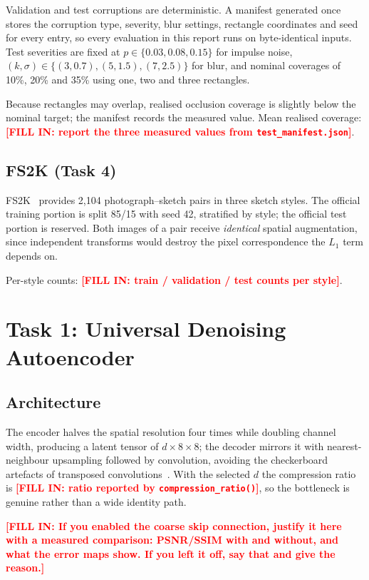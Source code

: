 \documentclass[conference]{IEEEtran}
\newcommand{\PLACEHOLDER}[1]{\textcolor{red}{\textbf{[FILL IN: #1]}}}
\begin{document}
Validation and test corruptions are deterministic. A manifest generated once
stores the corruption type, severity, blur settings, rectangle coordinates and
seed for every entry, so every evaluation in this report runs on byte-identical
inputs. Test severities are fixed at $p \in \{0.03, 0.08, 0.15\}$ for impulse
noise, $(k,\sigma) \in \{(3,0.7),(5,1.5),(7,2.5)\}$ for blur, and nominal
coverages of 10\%, 20\% and 35\% using one, two and three rectangles.

Because rectangles may overlap, realised occlusion coverage is slightly below
the nominal target; the manifest records the measured value. Mean realised
coverage: \PLACEHOLDER{report the three measured values from
\texttt{test\_manifest.json}}.

\subsection{FS2K (Task 4)}
FS2K~\cite{fan2022} provides 2{,}104 photograph--sketch pairs in three sketch
styles. The official training portion is split 85/15 with seed 42, stratified by
style; the official test portion is reserved. Both images of a pair receive
\emph{identical} spatial augmentation, since independent transforms would
destroy the pixel correspondence the $L_1$ term depends on.

Per-style counts: \PLACEHOLDER{train / validation / test counts per style}.

\section{Task 1: Universal Denoising Autoencoder}
\subsection{Architecture}
The encoder halves the spatial resolution four times while doubling channel
width, producing a latent tensor of $d \times 8 \times 8$; the decoder mirrors
it with nearest-neighbour upsampling followed by convolution, avoiding the
checkerboard artefacts of transposed convolutions~\cite{odena2016}. With the
selected $d$ the compression ratio is \PLACEHOLDER{ratio reported by
\texttt{compression\_ratio()}}, so the bottleneck is genuine rather than a wide
identity path.

\PLACEHOLDER{If you enabled the coarse skip connection, justify it here with a
measured comparison: PSNR/SSIM with and without, and what the error maps show.
If you left it off, say that and give the reason.}
\end{document}
